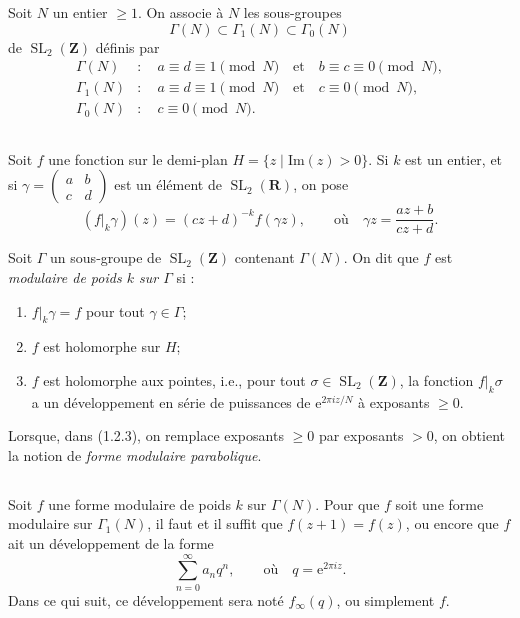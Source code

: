 \documentclass[11pt]{amsart}
\theoremstyle{plain}
\theoremstyle{definition}
\theoremstyle{remark}
\DeclareMathOperator{\SL}{SL}
\newcommand{\Z}{\mathbf{Z}}
\newcommand{\R}{\mathbf{R}}
\begin{document}
Soit $N$ un entier $\ge 1$. On associe à $N$ les sous-groupes
$$\Gamma(N) \subset \Gamma_1(N) \subset \Gamma_0(N)$$
de $\SL_2(\Z)$ définis par
\begin{align*}
\Gamma(N) &: \quad a \equiv d \equiv 1 \pmod{N} \quad \text{et} \quad b \equiv c \equiv 0 \pmod{N}, \\
\Gamma_1(N) &: \quad a \equiv d \equiv 1 \pmod{N} \quad \text{et} \quad c \equiv 0 \pmod{N}, \\
\Gamma_0(N) &: \quad c \equiv 0 \pmod{N}.
\end{align*}

\subsection{}

Soit $f$ une fonction sur le demi-plan $H = \{z \mid \mathrm{Im}(z) > 0\}$. Si $k$ est un entier,
et si $\gamma = \begin{pmatrix} a & b \\ c & d \end{pmatrix}$ est un élément de $\SL_2(\R)$, on pose
$$
(f|_k \gamma)(z) = (cz+d)^{-k} f(\gamma z), \qquad \text{où} \quad \gamma z = \frac{az+b}{cz+d}.
$$

Soit $\Gamma$ un sous-groupe de $\SL_2(\Z)$ contenant $\Gamma(N)$. On dit que $f$ est \emph{modulaire de poids $k$ sur $\Gamma$} si :
\begin{enumerate}
\item[(1.2.1)] $f|_k \gamma = f$ pour tout $\gamma \in \Gamma$;
\item[(1.2.2)] $f$ est holomorphe sur $H$;
\item[(1.2.3)] $f$ est holomorphe aux pointes, i.e., pour tout $\sigma \in \SL_2(\Z)$, la fonction $f|_k \sigma$ a un
développement en série de puissances de $\mathrm{e}^{2\pi iz/N}$ à exposants $\ge 0$.
\end{enumerate}

Lorsque, dans (1.2.3), on remplace exposants $\ge 0$ par exposants $> 0$, on obtient la notion de \emph{forme modulaire parabolique}.

\subsection{}

Soit $f$ une forme modulaire de poids $k$ sur $\Gamma(N)$. Pour que $f$ soit une forme modulaire sur $\Gamma_1(N)$, il faut et il suffit que $f(z+1) = f(z)$, ou encore que $f$ ait un développement de la forme
$$
\sum_{n=0}^{\infty} a_n q^n, \qquad \text{où} \quad q = \mathrm{e}^{2\pi iz}.
$$
Dans ce qui suit, ce développement sera noté $f_{\infty}(q)$, ou simplement $f$.
\end{document}
